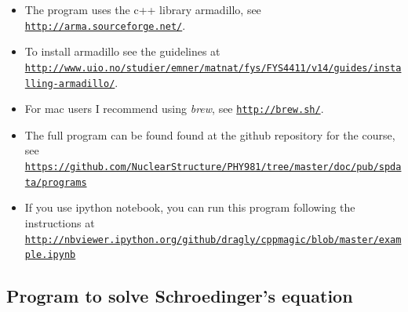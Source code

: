 \documentclass[%
twoside,                 %
final,                   %
10pt]{article}
\begin{document}
\begin{itemize}
\item The program uses the c++ library armadillo, see \href{{http://arma.sourceforge.net/}}{\nolinkurl{http://arma.sourceforge.net/}}. 

\item To install armadillo see the guidelines at \href{{http://www.uio.no/studier/emner/matnat/fys/FYS4411/v14/guides/installing-armadillo/}}{\nolinkurl{http://www.uio.no/studier/emner/matnat/fys/FYS4411/v14/guides/installing-armadillo/}}. 

\item For mac users I recommend using \emph{brew}, see \href{{http://brew.sh/}}{\nolinkurl{http://brew.sh/}}.

\item The full program can be found found at the github repository for the course, see \href{{https://github.com/NuclearStructure/PHY981/tree/master/doc/pub/spdata/programs}}{\nolinkurl{https://github.com/NuclearStructure/PHY981/tree/master/doc/pub/spdata/programs}}

\item If you use ipython notebook, you can run this program following the instructions at \href{{http://nbviewer.ipython.org/github/dragly/cppmagic/blob/master/example.ipynb}}{\nolinkurl{http://nbviewer.ipython.org/github/dragly/cppmagic/blob/master/example.ipynb}}
\end{itemize}

\noindent




\subsection*{Program to solve Schroedinger's equation}

\end{document}
